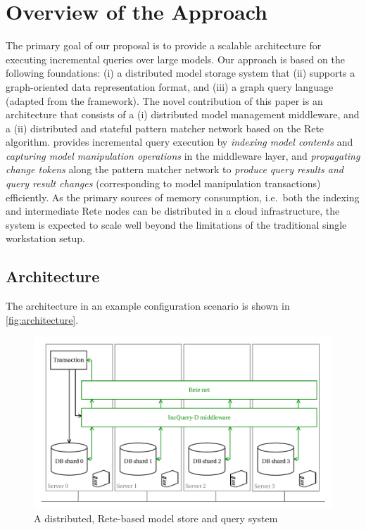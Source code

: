 \section{Overview of the Approach}
\label{sec:overview}

The primary goal of our proposal is to provide a scalable architecture for executing incremental queries over large models.  Our approach is based on the following foundations: (i) a distributed model storage system that (ii) supports a graph-oriented data representation format, and (iii) a graph query language (adapted from the \eiq{} framework). The novel contribution of this paper is an architecture that consists of a (i) distributed model management middleware, and a (ii) distributed and stateful pattern matcher network based on the Rete algorithm. \iqd{} provides incremental query execution by \emph{indexing model contents} and \emph{capturing model manipulation operations} in the middleware layer, and \emph{propagating change tokens} along the pattern matcher network to \emph{produce query results and query result changes} (corresponding to model manipulation transactions) efficiently. As the primary sources of memory consumption, i.e.\ both the indexing and intermediate Rete nodes can be distributed in a cloud infrastructure, the system is expected to scale well beyond the limitations of the traditional single workstation setup.

\subsection{Architecture}
\label{architecture}
The \iqd{} architecture in an example configuration scenario is shown in \autoref{fig:architecture}.

\begin{figure}[!t]
\begin{center}
\includegraphics[width=.95\columnwidth]{figures/architecture}
\caption{A distributed, Rete-based model store and query system}
\label{fig:architecture}
\end{center}
\end{figure}


